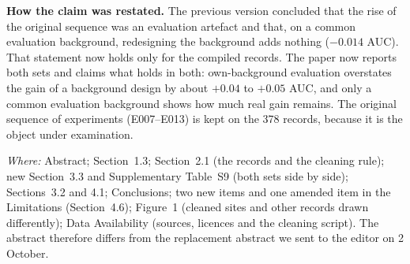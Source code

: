 \documentclass[11pt,a4paper]{article}
\begin{document}
\textbf{How the claim was restated.} The previous version concluded that the rise of the original sequence was an
evaluation artefact and that, on a common evaluation background, redesigning the background adds nothing ($-0.014$
AUC). That statement now holds only for the compiled records. The paper now reports both sets and claims what holds in
both: own-background evaluation overstates the gain of a background design by about $+0.04$ to $+0.05$ AUC, and only a
common evaluation background shows how much real gain remains. The original sequence of experiments (E007--E013) is
kept on the 378 records, because it is the object under examination.

\textit{Where:} Abstract; Section~1.3; Section~2.1 (the records and the cleaning rule); new Section~3.3 and
Supplementary Table~S9 (both sets side by side); Sections~3.2 and 4.1; Conclusions; two new items and one amended
item in the Limitations (Section~4.6); Figure~1 (cleaned sites and other records drawn differently); Data Availability
(sources, licences and the cleaning script). The abstract therefore differs from the replacement abstract we sent to the
editor on 2 October.
\end{document}
